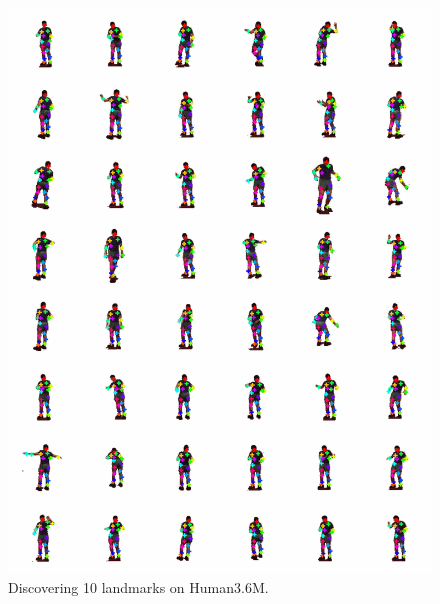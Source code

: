 \begin{figure}[t]
	\centering
	\includegraphics[trim={0cm 0cm 0cm 0cm},clip, width=1.\linewidth]{fig/supp/select48human}
	\caption{Discovering 10 landmarks on Human3.6M.}
	\label{fig:kp_human}
\end{figure}

